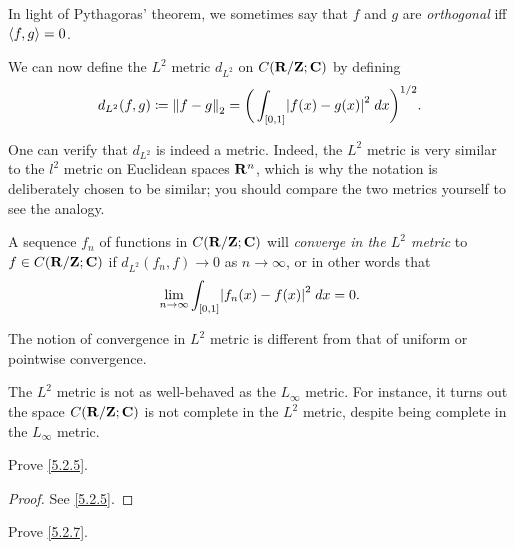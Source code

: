 \begin{note}
  In light of Pythagoras' theorem, we sometimes say that \(f\) and \(g\) are \emph{orthogonal} iff \(\inner*{f, g} = 0\).
\end{note}

\begin{additional corollary}\label{ac 5.2.2}
We can now define the \(L^2\) metric \(d_{L^2}\) on \(C(\R / \Z ; \C)\) by defining
\[
  d_{L^2}(f, g) \coloneqq \norm*{f - g}_2 = \bigg(\int_{[0, 1]} \abs{f(x) - g(x)}^2 \; dx\bigg)^{1 / 2}.
\]
\end{additional corollary}

\begin{remark}\label{5.2.8}
  One can verify that \(d_{L^2}\) is indeed a metric.
  Indeed, the \(L^2\) metric is very similar to the \(l^2\) metric on Euclidean spaces \(\R^n\), which is why the notation is deliberately chosen to be similar;
  you should compare the two metrics yourself to see the analogy.
\end{remark}

\begin{note}
  A sequence \(f_n\) of functions in \(C(\R / \Z ; \C)\) will \emph{converge in the \(L^2\) metric} to \(f \in C(\R / \Z ; \C)\) if \(d_{L^2}(f_n, f) \to 0\) as \(n \to \infty\), or in other words that
  \[
    \lim_{n \to \infty} \int_{[0, 1]} \abs{f_n(x) - f(x)}^2 \; dx = 0.
  \]
\end{note}

\begin{remark}\label{5.2.9}
  The notion of convergence in \(L^2\) metric is different from that of uniform or pointwise convergence.
\end{remark}

\begin{remark}\label{5.2.10}
  The \(L^2\) metric is not as well-behaved as the \(L_\infty\) metric.
  For instance, it turns out the space \(C(\R / \Z ; \C)\) is not complete in the \(L^2\) metric, despite being complete in the \(L_\infty\) metric.
\end{remark}

\exercisesection

\begin{exercise}\label{ex 5.2.1}
  Prove \cref{5.2.5}.
\end{exercise}

\begin{proof}
  See \cref{5.2.5}.
\end{proof}

\begin{exercise}\label{ex 5.2.2}
  Prove \cref{5.2.7}.
\end{exercise}

